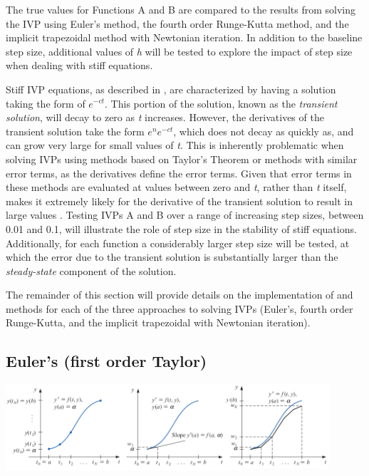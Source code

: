 \documentclass{article}
\begin{document}
The true values for Functions A and B are compared to the results from solving the IVP using Euler's method, the fourth order Runge-Kutta method, and the implicit trapezoidal method with Newtonian iteration. In addition to the baseline step size, additional values of \textit{h} will be tested to explore the impact of step size when dealing with stiff equations. 

Stiff IVP equations, as described in \cite{burden2010}, are characterized by having a solution taking the form of $e^{-ct}$. This portion of the solution, known as the \textit{transient solution}, will decay to zero as \textit{t} increases. However, the derivatives of the transient solution take the form $e^{n}e^{-ct}$, which does not decay as quickly as, and can grow very large for small values of \textit{t}. This is inherently problematic when solving IVPs using methods based on Taylor's Theorem or methods with similar error terms, as the derivatives define the error terms. Given that error terms in these methods are evaluated at values between zero and \textit{t}, rather than \textit{t} itself, makes it extremely likely for the derivative of the transient solution to result in large values \citep{burden2010}. Testing IVPs A and B over a range of increasing step sizes, between 0.01 and 0.1, will illustrate the role of step size in the stability of stiff equations. Additionally, for each function a considerably larger step size will be tested, at which the error due to the transient solution is substantially larger than the \textit{steady-state} component of the solution.

The remainder of this section will provide details on the implementation of and methods for each of the three approaches to solving IVPs (Euler's, fourth order Runge-Kutta, and the implicit trapezoidal with Newtonian iteration).


\subsection{Euler's (first order Taylor)}
\label{method:euler}

\begin{center}
  \includegraphics[width=0.9\textwidth]{../additional/euler_method.png}
  \label{fig:euler_method}
\end{center}
\end{document}
